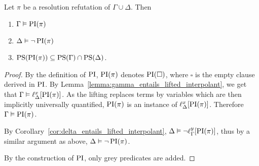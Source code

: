 \begin{corr}
	\label{cor:propositional_interpolant}
	Let $\pi$ be a resolution refutation of $\Gamma \cup \Delta$.
	Then
	\begin{enumerate}
		\item$\Gamma\vDash \operatorname{PI}(\pi)$
		\item$\Delta\vDash \lnot \operatorname{PI}(\pi)$
		\item $\operatorname{PS}(\operatorname{PI}(\pi)) \subseteq \operatorname{PS}(\Gamma) \cap \operatorname{PS}(\Delta)$.
	\end{enumerate}
\end{corr}
\begin{proof}
	By the definition of $\operatorname{PI}$, 
	$\operatorname{PI}(\pi)$ denotes $\operatorname{PI}(\square)$, where $\square$ is the empty clause derived in $\operatorname{PI}$.
	By Lemma~\ref{lemma:gamma_entails_lifted_interpolant}, we get that 
	$ \Gamma \vDash \ell_{\Delta}^{x}[\operatorname{PI}(\pi)]$.
	As the lifting replaces terms by variables which are then implicitly universally quantified, $\operatorname{PI}(\pi)$ is an instance of $\ell_{\Delta}^{x}[\operatorname{PI}(\pi)]$.
	Therefore $\Gamma \vDash \operatorname{PI}(\pi)$.

	By Corollary~\ref{cor:delta_entails_lifted_interpolant}, $\Delta \vDash \lnot \ell_{\Gamma}^{y}[\operatorname{PI}(\pi)]$,
	thus by a similar argument as above, $\Delta \vDash \lnot \operatorname{PI}(\pi)$.


	By the construction of $\operatorname{PI}$, only grey predicates are added.
\end{proof}

